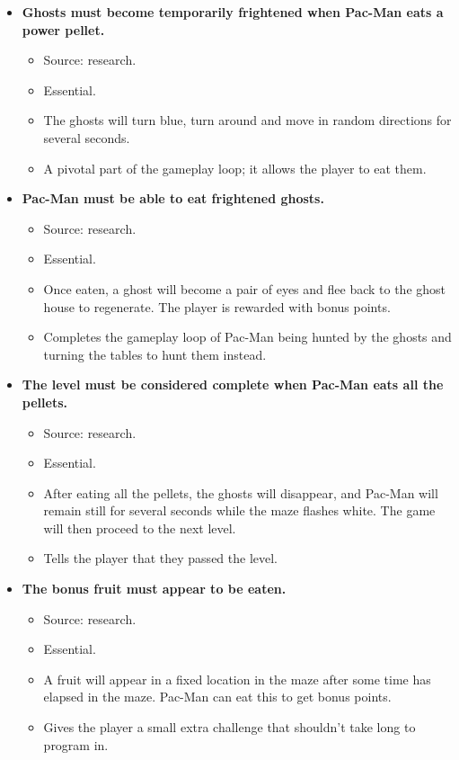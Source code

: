 \documentclass[letterpaper, 11pt]{article}
\begin{document}
\begin{itemize}
\item \textbf{Ghosts must become temporarily frightened when Pac-Man eats a power pellet.}
\begin{itemize}
\item Source: research.
\item Essential.
\item The ghosts will turn blue, turn around and move in random directions for several seconds.
\item A pivotal part of the gameplay loop; it allows the player to eat them.
\end{itemize}
\end{itemize}


\begin{itemize}
\item \textbf{Pac-Man must be able to eat frightened ghosts.}
\begin{itemize}
\item Source: research.
\item Essential.
\item Once eaten, a ghost will become a pair of eyes and flee back to the ghost house to regenerate.
The player is rewarded with bonus points.
\item Completes the gameplay loop of Pac-Man being hunted by the ghosts and turning the tables to hunt them instead.
\end{itemize}
\end{itemize}


\begin{itemize}
\item \textbf{The level must be considered complete when Pac-Man eats all the pellets.}
\begin{itemize}
\item Source: research.
\item Essential.
\item After eating all the pellets, the ghosts will disappear, and Pac-Man will remain still for several seconds while the maze flashes white.
The game will then proceed to the next level.
\item Tells the player that they passed the level.
\end{itemize}
\end{itemize}


\begin{itemize}
\item \textbf{The bonus fruit must appear to be eaten.}
\begin{itemize}
\item Source: research.
\item Essential.
\item A fruit will appear in a fixed location in the maze after some time has elapsed in the maze.
Pac-Man can eat this to get bonus points.
\item Gives the player a small extra challenge that shouldn’t take long to program in.
\end{itemize}
\end{itemize}
\end{document}
